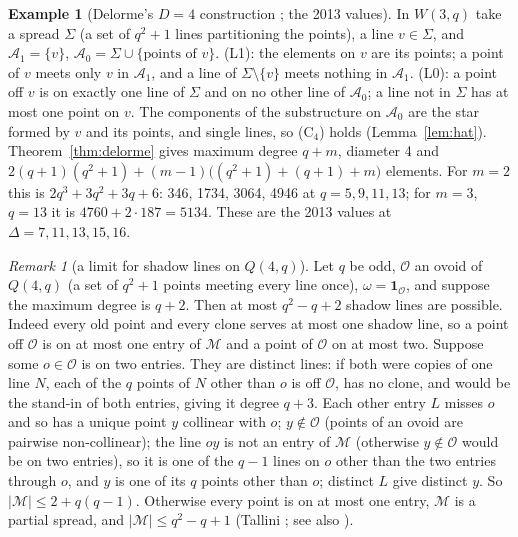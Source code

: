 \documentclass[11pt]{amsart}
\theoremstyle{definition}
\newtheorem{example}[theorem]{Example}
\theoremstyle{remark}
\newtheorem{remark}[theorem]{Remark}
\numberwithin{equation}{section}
\newcommand{\cA}{\mathcal A}
\newcommand{\cM}{\mathcal M}
\newcommand{\cO}{\mathcal O}
\begin{document}
\begin{example}[Delorme's $D=4$ construction {\cite[\S8(a)]{D85a}}; the 2013 values]\label{ex:delorme4}
In $W(3,q)$ take a spread $\Sigma$ (a set of $q^2+1$ lines partitioning the points), a line $v\in\Sigma$, and
$\cA_1=\{v\}$, $\cA_0=\Sigma\cup\{\text{points of }v\}$. (L1): the elements on $v$ are its points; a point of $v$ meets
only $v$ in $\cA_1$, and a line of $\Sigma\setminus\{v\}$ meets nothing in $\cA_1$. (L0): a point off $v$ is on exactly
one line of $\Sigma$ and on no other line of $\cA_0$; a line not in $\Sigma$ has at most one point on $v$. The
components of the substructure on $\cA_0$ are the star formed by $v$ and its points, and single lines, so (C$_4$) holds
(Lemma~\ref{lem:hat}). Theorem~\ref{thm:delorme} gives maximum degree $q+m$, diameter 4 and
$2(q+1)(q^2+1)+(m-1)\bigl((q^2+1)+(q+1)+m\bigr)$ elements. For $m=2$ this is $2q^3+3q^2+3q+6$: 346, 1734, 3064, 4946 at
$q=5,9,11,13$; for $m=3$, $q=13$ it is $4760+2\cdot187=5134$. These are the 2013 values at $\Delta=7,11,13,15,16$.
\end{example}

\begin{remark}[a limit for shadow lines on $Q(4,q)$]\label{rem:shadowlimit}
Let $q$ be odd, $\cO$ an ovoid of $Q(4,q)$ (a set of $q^2+1$ points meeting every line once), $\omega=\mathbf 1_\cO$,
and suppose the maximum degree is $q+2$. Then at most $q^2-q+2$ shadow lines are possible. Indeed every old point and
every clone serves at most one shadow line, so a point off $\cO$ is on at most one entry of $\cM$ and a point of $\cO$ on
at most two. Suppose some $o\in\cO$ is on two entries. They are distinct lines: if both were copies of one line $N$, each
of the $q$ points of $N$ other than $o$ is off $\cO$, has no clone, and would be the stand-in of both entries, giving it
degree $q+3$. Each other entry $L$ misses $o$ and so has a unique point $y$ collinear with $o$; $y\notin\cO$ (points of
an ovoid are pairwise non-collinear); the line $oy$ is not an entry of $\cM$ (otherwise $y\notin\cO$ would be on two
entries), so it is one of the $q-1$ lines on $o$ other than the two entries through $o$, and $y$ is one of its $q$ points
other than $o$; distinct $L$ give distinct $y$. So $|\cM|\le2+q(q-1)$. Otherwise every point is on at most one entry,
$\cM$ is a partial spread, and $|\cM|\le q^2-q+1$ (Tallini \cite{Tal91}; see also \cite[\S1]{CDPS22}).
\end{remark}
\end{document}
